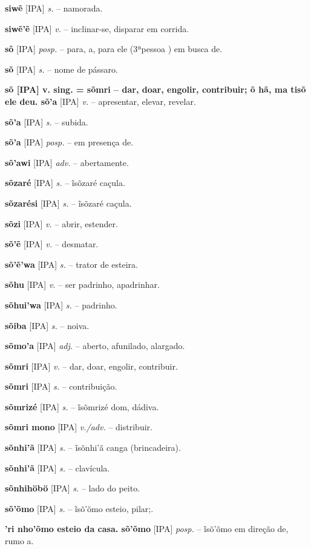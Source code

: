 \textbf{siwẽ} [IPA] \textit{s.} -- namorada.

\textbf{siwẽ'ẽ} [IPA] \textit{v.} -- inclinar-se, disparar em corrida.

\textbf{sô} [IPA] \textit{posp.} -- para, a, para ele (3ªpessoa ) em busca de.

\textbf{sõ} [IPA] \textit{s.} -- nome de pássaro.

\textbf{sõ [IPA] v. sing. = sõmri -- dar, doar, engolir, contribuir; õ hã, ma tisõ ele deu. sõ'a} [IPA] \textit{v.} -- apresentar, elevar, revelar.

\textbf{sõ'a} [IPA] \textit{s.} -- subida.

\textbf{sõ'a} [IPA] \textit{posp.} -- em presença de.

\textbf{sõ'awi} [IPA] \textit{adv.} -- abertamente.

\textbf{sõzaré} [IPA] \textit{s.} -- ĩsõzaré caçula.

\textbf{sõzarési} [IPA] \textit{s.} -- ĩsõzaré caçula.

\textbf{sõzi} [IPA] \textit{v.} -- abrir, estender.

\textbf{sõ'ẽ} [IPA] \textit{v.} -- desmatar.

\textbf{sõ'ẽ'wa} [IPA] \textit{s.} -- trator de esteira.

\textbf{sõhu} [IPA] \textit{v.} -- ser padrinho, apadrinhar.

\textbf{sõhui'wa} [IPA] \textit{s.} -- padrinho.

\textbf{sõiba} [IPA] \textit{s.} -- noiva.

\textbf{sõmo'a} [IPA] \textit{adj.} -- aberto, afunilado, alargado.

\textbf{sõmri} [IPA] \textit{v.} -- dar, doar, engolir, contribuir.

\textbf{sõmri} [IPA] \textit{s.} -- contribuição.

\textbf{sõmrizé} [IPA] \textit{s.} -- ĩsõmrizé dom, dádiva.

\textbf{sõmri mono} [IPA] \textit{v./adv.} -- distribuir.

\textbf{sõnhi'ã} [IPA] \textit{s.} -- ĩsõnhi'ã canga (brincadeira).

\textbf{sõnhi'ã} [IPA] \textit{s.} -- clavícula.

\textbf{sõnhihöbö} [IPA] \textit{s.} -- lado do peito.

\textbf{sõ'õmo} [IPA] \textit{s.} -- ĩsõ'õmo esteio, pilar;.

\textbf{'ri nho'õmo esteio da casa. sõ'õmo} [IPA] \textit{posp.} -- ĩsõ'õmo em direção de, rumo a.


